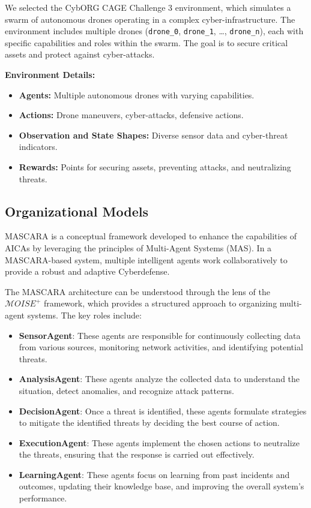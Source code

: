 \documentclass[conference]{IEEEtran}
\begin{document}
We selected the CybORG CAGE Challenge 3 environment, which simulates a swarm of autonomous drones operating in a complex cyber-infrastructure. The environment includes multiple drones (\texttt{drone\_0}, \texttt{drone\_1}, \ldots, \texttt{drone\_n}), each with specific capabilities and roles within the swarm. The goal is to secure critical assets and protect against cyber-attacks.

\textbf{Environment Details:}
\begin{itemize}
    \item \textbf{Agents:} Multiple autonomous drones with varying capabilities.
    \item \textbf{Actions:} Drone maneuvers, cyber-attacks, defensive actions.
    \item \textbf{Observation and State Shapes:} Diverse sensor data and cyber-threat indicators.
    \item \textbf{Rewards:} Points for securing assets, preventing attacks, and neutralizing threats.
\end{itemize}


\subsection{Organizational Models}

MASCARA is a conceptual framework developed to enhance the capabilities of AICAs by leveraging the principles of Multi-Agent Systems (MAS). In a MASCARA-based system, multiple intelligent agents work collaboratively to provide a robust and adaptive Cyberdefense.

The MASCARA architecture can be understood through the lens of the $\mathcal{M}OISE^+$ framework, which provides a structured approach to organizing multi-agent systems.
%
The key roles include:
%
\begin{itemize}
    \item \textbf{SensorAgent}: These agents are responsible for continuously collecting data from various sources, monitoring network activities, and identifying potential threats.
    \item \textbf{AnalysisAgent}: These agents analyze the collected data to understand the situation, detect anomalies, and recognize attack patterns.
    \item \textbf{DecisionAgent}: Once a threat is identified, these agents formulate strategies to mitigate the identified threats by deciding the best course of action.
    \item \textbf{ExecutionAgent}: These agents implement the chosen actions to neutralize the threats, ensuring that the response is carried out effectively.
    \item \textbf{LearningAgent}: These agents focus on learning from past incidents and outcomes, updating their knowledge base, and improving the overall system's performance.
\end{itemize}
\end{document}
